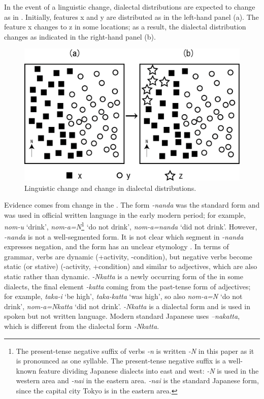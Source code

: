 \documentclass[output=paper]{LSP/langsci}
\begin{document}
In the event of a linguistic change, dialectal distributions are expected to change as in . Initially, features x and y are distributed as in the left-hand panel (a). The feature x changes to z in some locations; as a result, the dialectal distribution changes as indicated in the right-hand panel (b).

\begin{figure}
\includegraphics[width=\textwidth]{illustrations/onishi_fig1}
\caption{Linguistic change and change in dialectal distributions.}
\label{fig:onishi:1}
\end{figure}

Evidence comes from change in the . The form \textit{-nanda} was the standard form and was used in official written language in the early modern period; for example, \textit{nom-u} ‘drink’, \textit{nom-a=N}\footnote{ The present-tense negative suffix of verbs \textit{-n} is written \textit{-N} in this paper as it is pronounced as one syllable. The present-tense negative suffix is a well-known feature dividing Japanese dialects into east and west: \textit{-N} is used in the western area and \textit{-nai} in the eastern area. \textit{-nai} is the standard Japanese form, since the capital city Tokyo is in the eastern area.} ‘do not drink’, \textit{nom-a=nanda} ‘did not drink’. However, \textit{{}-nanda} is not a well-segmented form. It is not clear which segment in \textit{-nanda} expresses negation, and the form has an unclear etymology \citep{onishi_atarashii_1999}. In terms of grammar, verbs are dynamic (+activity, -condition), but negative verbs become static (or stative) (-activity, +condition) and similar to adjectives, which are also static rather than dynamic. \textit{-Nkatta} is a newly occurring form of the  in some dialects, the final element \textit{{}-katta} coming from the past-tense form of adjectives; for example, \textit{taka-i} ‘be high’, \textit{taka-katta} ‘was high’,  so also \textit{nom-a=N} ‘do not drink’, \textit{nom-a=Nkatta} ‘did not drink’. \textit{-Nkatta} is a dialectal form and is used in spoken but not written language. Modern standard Japanese uses \textit{–nakatta}, which is different from the dialectal form \textit{-Nkatta}. 
\end{document}

